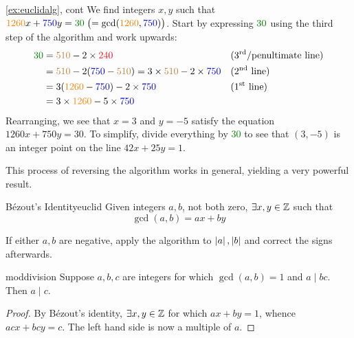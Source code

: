 \begin{example*}{\ref{ex:euclidalg}, cont}{}
	We find integers $x,y$ such that $\textcolor{orange}{1260}x+\textcolor{blue}{750}y=\textcolor{Green}{30} \bigm(=\gcd(\textcolor{orange}{1260},\textcolor{blue}{750})\bigr)$.\smallbreak
	Start by expressing $\textcolor{Green}{30}$ using the third step of the algorithm and work upwards:
	\begin{align*}
		\textcolor{Green}{30} &=\textcolor{brown}{510}-2\times\textcolor{red}{240} & &\text{(3\rd/penultimate line)}\\
		&=\textcolor{brown}{510}-2(\textcolor{blue}{750}-\textcolor{brown}{510}) =3\times \textcolor{brown}{510}-2\times \textcolor{blue}{750} &&\text{(2\nd{} line)}\\
		&=3(\textcolor{orange}{1260}-\textcolor{blue}{750})-2\times \textcolor{blue}{750} &&\text{(1\st{} line)}\\
		&=3\times \textcolor{orange}{1260}-5\times \textcolor{blue}{750}
	\end{align*}
	Rearranging, we see that $x=3$ and $y=-5$ satisfy the equation $1260x+750y=30$. To simplify, divide everything by \textcolor{Green}{30} to see that $(3,-5)$ is an integer point on the line $42x+25y=1$.
\end{example*}


This process of reversing the algorithm works in general, yielding a very powerful result.

\begin{cor}{Bézout's Identity}{euclid}
	Given integers $a,b$, not both zero, $\exists x,y\in\mathbb{Z}$ such that\vspace{-8pt}
	\[
		\gcd(a,b)=ax+by
	\]
\end{cor}

If either $a,b$ are negative, apply the algorithm to $\left| a\right|,\left| b\right|$ and correct the signs afterwards.

\begin{cor}{}{moddivision}
	Suppose $a,b,c$ are integers for which $\gcd(a,b)=1$ and $a\mid bc$. Then $a\mid c$.
\end{cor}

\begin{proof}
	By Bézout's identity, $\exists x,y\in\mathbb{Z}$ for which $ax+by=1$, whence $acx+bcy=c$. The left hand side is now a multiple of $a$.
\end{proof}

